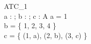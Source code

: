 \begin{schema}{ATC\_1}\\
 a : \nat ;
 b : \power \nat ;
 c : \power \nat \cross A
\where
 a = 1 \\
 b = \{ 1, 2, 3, 4 \} \\
 c = \{ (1, a), (2, b), (3, c) \} \\
\end{schema}